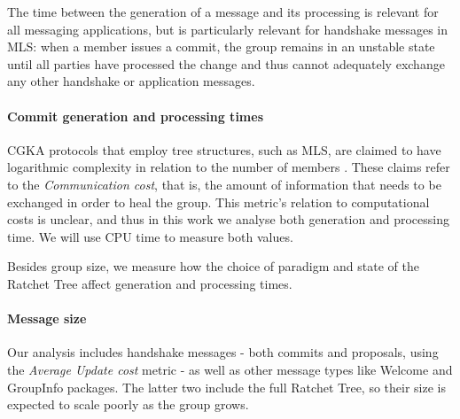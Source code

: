 \documentclass[preprint, 12pt]{elsarticle}
\begin{document}
The time between the generation of a message and its processing is relevant for all messaging applications, but is particularly relevant for handshake messages in MLS: when a member issues a commit, the group remains in an unstable state until all parties have processed the change and thus cannot adequately exchange any other handshake or application messages. 


\paragraph{\textbf{Commit generation and processing times}}

CGKA protocols that employ tree structures, such as MLS, are claimed to have logarithmic complexity in relation to the number of members \cite{saik, cocoa}. These claims refer to the \textit{Communication cost}, that is, the amount of information that needs to be exchanged in order to heal the group. This metric's relation to computational costs is unclear, and thus in this work we analyse both generation and processing time. We will use CPU time to measure both values.

Besides group size, we measure how the choice of paradigm and state of the Ratchet Tree affect generation and processing times.

\paragraph{\textbf{Message size}}

Our analysis includes handshake messages - both commits and proposals, using the \textit{Average Update cost} metric - as well as other message types like Welcome and GroupInfo packages. The latter two include the full Ratchet Tree, so their size is expected to scale poorly as the group grows.
\end{document}

